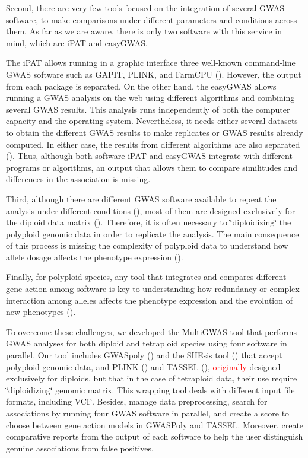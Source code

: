 \documentclass{article}
\begin{document}
Second, there are very few tools focused on the integration of several GWAS software, to make comparisons under different parameters and conditions across them. As far as we are aware, there is only two software with this service in mind, which are iPAT and easyGWAS.

The iPAT allows running in a graphic interface three well-known command-line GWAS software such as GAPIT, PLINK, and FarmCPU (\cite{Zhang2018}). However, the output from each package is separated. On the other hand, the easyGWAS allows running a GWAS analysis on the web using different algorithms and combining several GWAS results. This analysis runs independently of both the computer capacity and the operating system. Nevertheless, it needs either several datasets to obtain the different GWAS results to make replicates or GWAS results already computed. In either case, the results from different algorithms are also separated (\cite{Grimm2017}). Thus, although both software iPAT and easyGWAS integrate with different programs or algorithms, an output that allows them to compare similitudes and differences in the association is missing.

Third, although there are different GWAS software available to repeat the analysis under different conditions (\cite{Gumpinger2018}), most of them are designed exclusively for the diploid data matrix (\cite{Bourke2018}). Therefore, it is often necessary to \char`\"{}diploidizing\char`\"{} the polyploid genomic data in order to replicate the analysis. The main consequence of this process is missing the complexity of polyploid data to understand how allele dosage affects the phenotype expression (\cite{Ferrao2018}).

Finally, for polyploid species, any tool that integrates and compares different gene action among software is key to understanding how redundancy or complex interaction among alleles affects the phenotype expression and the evolution of new phenotypes (\cite{Bourke2018,Rosyara2016,Ferrao2018}).

To overcome these challenges, we developed the MultiGWAS tool that performs GWAS analyses for both diploid and tetraploid species using four software in parallel. Our tool includes GWASpoly (\cite{Rosyara2016}) and the SHEsis tool (\cite{Shen2016}) that accept polyploid genomic data, and PLINK (\cite{Purcell2007}) and TASSEL (\cite{Bradbury2007}), \textcolor{red}{\textcolor{red}{}originally} designed exclusively for diploids, but that in the case of tetraploid data, their use require \char`\"{}diploidizing\char`\"{} genomic matrix. This wrapping tool deals with different input file formats, including VCF. Besides, manage data preprocessing, search for associations by running four GWAS software in parallel, and create a score to choose between gene action models in GWASPoly and TASSEL. Moreover, create comparative reports from the output of each software to help the user distinguish genuine associations from false positives.
\end{document}
